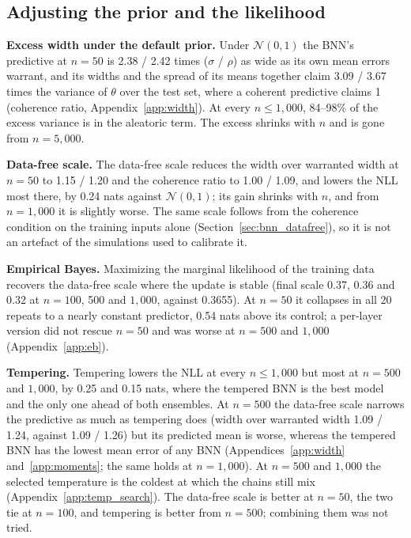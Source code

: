 \documentclass[11pt]{article}
\begin{document}
\subsection{Adjusting the prior and the likelihood}
\label{sec:variants}\label{sec:res_tempering}\label{sec:res_datafree}%
\textbf{Excess width under the default prior.} Under $\mathcal N(0,1)$ the BNN's predictive at $n=50$ is 2.38 / 2.42
times ($\sigma$ / $\rho$) as wide as its own mean errors warrant, and its widths and the spread of its means together
claim 3.09 / 3.67 times the variance of $\theta$ over the test set, where a coherent predictive claims 1 (coherence
ratio, Appendix~\ref{app:width}). At every $n\le1{,}000$, 84--98\% of the excess variance is in the aleatoric term. The
excess shrinks with $n$ and is gone from $n=5{,}000$.

\textbf{Data-free scale.} The data-free scale reduces the width over warranted width at $n=50$ to 1.15 / 1.20 and the
coherence ratio to 1.00 / 1.09, and lowers the NLL most there, by 0.24 nats against $\mathcal N(0,1)$; its gain shrinks
with $n$, and from $n=1{,}000$ it is slightly worse. The same scale follows from the coherence condition on the
training inputs alone (Section~\ref{sec:bnn_datafree}), so it is not an artefact of the simulations used to calibrate it.

\textbf{Empirical Bayes.} Maximizing the marginal likelihood of the training data recovers the data-free scale where the
update is stable (final scale 0.37, 0.36 and 0.32 at $n=100$, 500 and $1{,}000$, against 0.3655). At $n=50$ it collapses
in all 20 repeats to a nearly constant predictor, 0.54 nats above its control; a per-layer version did not rescue $n=50$
and was worse at $n=500$ and $1{,}000$ (Appendix~\ref{app:eb}).

\textbf{Tempering.} Tempering lowers the NLL at every $n\le1{,}000$ but most at $n=500$ and $1{,}000$, by 0.25 and 0.15
nats, where the tempered BNN is the best model and the only one ahead of both ensembles. At $n=500$ the data-free scale
narrows the predictive as much as tempering does (width over warranted width 1.09 / 1.24, against 1.09 / 1.26) but its
predicted mean is worse, whereas the tempered BNN has the lowest mean error of any BNN (Appendices~\ref{app:width}
and~\ref{app:moments}; the same holds at $n=1{,}000$). At $n=500$ and $1{,}000$ the selected temperature is the coldest at
which the chains still mix (Appendix~\ref{app:temp_search}). The data-free scale is better at $n=50$, the two tie at
$n=100$, and tempering is better from $n=500$; combining them was not tried.
\end{document}
